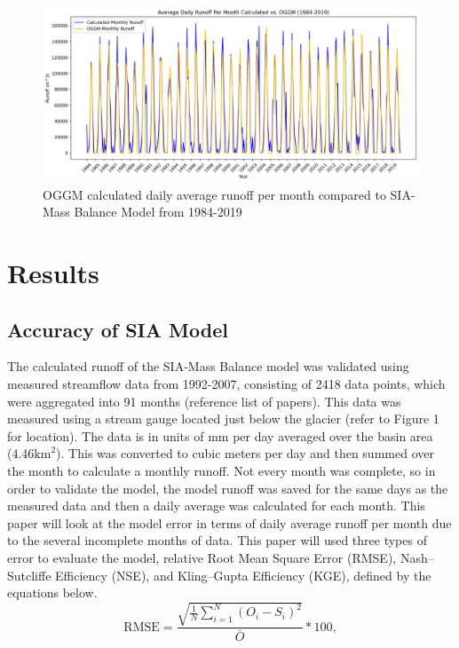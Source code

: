\documentclass{article}
\begin{document}
\begin{figure}[h!]
    \includegraphics[width=1.3\textwidth]{Plots/oggm_vs_calculated.png}
    \caption{OGGM calculated daily average runoff per month compared to SIA-Mass Balance Model from 1984-2019}
    \label{fig:oggm_model_run_1984_2019}
\end{figure}
\FloatBarrier

\section{Results}
\subsection{Accuracy of SIA Model}
The calculated runoff of the SIA-Mass Balance model was validated using measured streamflow data from 1992-2007, consisting of 2418 
data points, which were aggregated into 91 months (reference list of papers). This data was measured using 
a stream gauge located just below the glacier (refer to Figure 1 for location). The data is in units of mm per day averaged over the basin area (4.46$\text{km}^2$). This was  
converted to cubic meters per day and then 
summed over the month to calculate a monthly runoff. Not every month was complete, so in order to validate the model, the model runoff was saved 
for the same days as the measured data and then a daily average was calculated for each month. 
This paper will look at the model error in terms of daily average runoff per month due to the several incomplete months of data. 
This paper will used 
three types of error to evaluate the model, relative Root Mean Square Error (RMSE), Nash–Sutcliffe Efficiency (NSE), and Kling–Gupta Efficiency 
(KGE), defined by the equations below. 
\begin{equation}
    \mathrm{RMSE} = \frac{\sqrt{\frac{1}{N}\sum_{i=1}^{N} \left( O_i - S_i \right)^2}}{\bar{O}}*100,
\end{equation}
\end{document}
